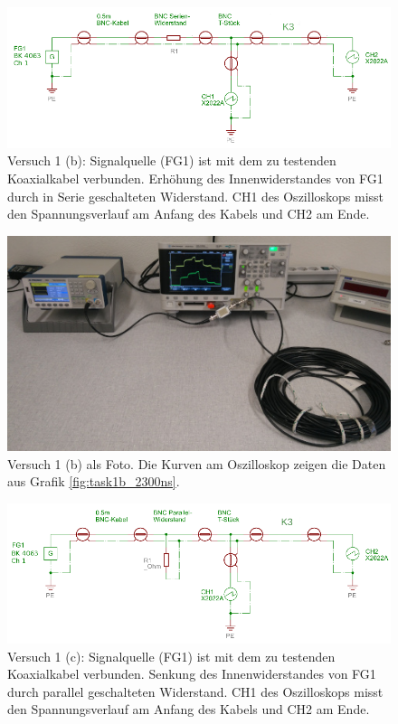\documentclass{article}
\begin{document}
\begin{figure}[H]
\centering
\caption{Versuch 1 (b): Signalquelle (FG1) ist mit dem zu testenden Koaxialkabel verbunden. Erhöhung des Innenwiderstandes von FG1 durch in Serie geschalteten Widerstand. CH1 des Oszilloskops misst den Spannungsverlauf am Anfang des Kabels und CH2 am Ende.}
\label{fig:anordnung_task1b}
\includegraphics[scale=2]{task1b.png}
\end{figure}



\begin{figure}[H]
\centering
\caption{Versuch 1 (b) als Foto. Die Kurven am Oszilloskop zeigen die Daten aus Grafik \ref{fig:task1b_2300ns}.}
\label{fig:foto_task1b}
\includegraphics[scale=0.6]{foto_task1b.jpg}
\end{figure}



\begin{figure}[H]
\centering
\caption{Versuch 1 (c): Signalquelle (FG1) ist mit dem zu testenden Koaxialkabel verbunden. Senkung des Innenwiderstandes von FG1 durch parallel geschalteten Widerstand. CH1 des Oszilloskops misst den Spannungsverlauf am Anfang des Kabels und CH2 am Ende.}
\label{fig:anordnung_task1c}
\includegraphics[scale=2]{task1c.png}
\end{figure}
\end{document}
